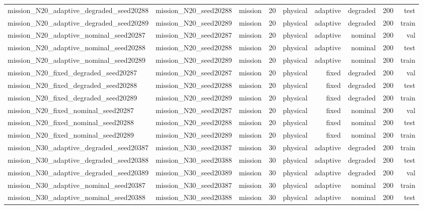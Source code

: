 \begin{tabular}{lrrrrrrrr}
mission\_N20\_adaptive\_degraded\_seed20288 & mission\_N20\_seed20288 & mission & 20 & physical & adaptive & degraded & 200 & test \\
mission\_N20\_adaptive\_degraded\_seed20289 & mission\_N20\_seed20289 & mission & 20 & physical & adaptive & degraded & 200 & train \\
mission\_N20\_adaptive\_nominal\_seed20287 & mission\_N20\_seed20287 & mission & 20 & physical & adaptive & nominal & 200 & val \\
mission\_N20\_adaptive\_nominal\_seed20288 & mission\_N20\_seed20288 & mission & 20 & physical & adaptive & nominal & 200 & test \\
mission\_N20\_adaptive\_nominal\_seed20289 & mission\_N20\_seed20289 & mission & 20 & physical & adaptive & nominal & 200 & train \\
mission\_N20\_fixed\_degraded\_seed20287 & mission\_N20\_seed20287 & mission & 20 & physical & fixed & degraded & 200 & val \\
mission\_N20\_fixed\_degraded\_seed20288 & mission\_N20\_seed20288 & mission & 20 & physical & fixed & degraded & 200 & test \\
mission\_N20\_fixed\_degraded\_seed20289 & mission\_N20\_seed20289 & mission & 20 & physical & fixed & degraded & 200 & train \\
mission\_N20\_fixed\_nominal\_seed20287 & mission\_N20\_seed20287 & mission & 20 & physical & fixed & nominal & 200 & val \\
mission\_N20\_fixed\_nominal\_seed20288 & mission\_N20\_seed20288 & mission & 20 & physical & fixed & nominal & 200 & test \\
mission\_N20\_fixed\_nominal\_seed20289 & mission\_N20\_seed20289 & mission & 20 & physical & fixed & nominal & 200 & train \\
mission\_N30\_adaptive\_degraded\_seed20387 & mission\_N30\_seed20387 & mission & 30 & physical & adaptive & degraded & 200 & train \\
mission\_N30\_adaptive\_degraded\_seed20388 & mission\_N30\_seed20388 & mission & 30 & physical & adaptive & degraded & 200 & test \\
mission\_N30\_adaptive\_degraded\_seed20389 & mission\_N30\_seed20389 & mission & 30 & physical & adaptive & degraded & 200 & val \\
mission\_N30\_adaptive\_nominal\_seed20387 & mission\_N30\_seed20387 & mission & 30 & physical & adaptive & nominal & 200 & train \\
mission\_N30\_adaptive\_nominal\_seed20388 & mission\_N30\_seed20388 & mission & 30 & physical & adaptive & nominal & 200 & test \\

\end{tabular}
